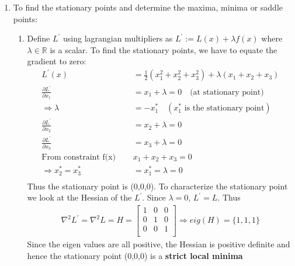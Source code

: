 \begin{enumerate}
  
  \item To find the stationary points and determine the maxima, minima or saddle
points:
  \begin{enumerate}
   \item %
   Define $L^\prime$  using lagrangian multipliers as $L^\prime := L(x) +
\lambda f(x)$ where $\lambda \in \mathbb{R}$ is a scalar. To find the stationary
points, we have to equate the gradient to zero:
   \begin{align*}
    L^\prime (x) &= \frac{1}{2} (x_1^2 + x_2^2 + x_3^2) + \lambda (x_1 + x_2 +
x_3) \\
    \frac{\partial L^\prime}{\partial x_1} &= x_1 + \lambda  = 0  \quad
\text{(at stationary point)}\\
    \Rightarrow \lambda &= -x_1^* \quad (x_1^* \text{ is the stationary
point})\\
    \frac{\partial L^\prime}{\partial x_2} &= x_2 + \lambda  = 0  \\
    \frac{\partial L^\prime}{\partial x_3} &= x_3 + \lambda  = 0  \\
    \text{From constraint  f(x) }\quad  &x_1 + x_2 + x_3 = 0 \\
    \Rightarrow x_2^* = x_3^* &= x_1^* = \lambda = 0\\
   \end{align*}
   Thus the stationary point is (0,0,0). To characterize the stationary point we
look at the Hessian of the $L^\prime$. Since $\lambda = 0$, $L^\prime = L$.
Thus 
   \begin{align*}
    \nabla^2 L^\prime = \nabla^2 L = H = \begin{bmatrix}
                                      1 & 0 & 0 \\
                                      0 & 1 & 0 \\
                                      0 & 0 & 1 \\
                                     \end{bmatrix}
    \Rightarrow eig(H) = \{1,1,1\}                                     
   \end{align*}
   Since the eigen values are all positive, the Hessian is positive definite and
hence the stationary point (0,0,0) is a \textbf{strict local minima}
   

\end{enumerate}
\end{enumerate}
